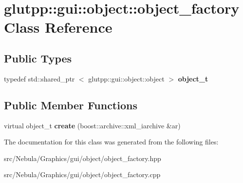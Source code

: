 \hypertarget{classglutpp_1_1gui_1_1object_1_1object__factory}{\section{glutpp\-:\-:gui\-:\-:object\-:\-:object\-\_\-factory \-Class \-Reference}
\label{classglutpp_1_1gui_1_1object_1_1object__factory}
}
\subsection*{\-Public \-Types}
\begin{DoxyCompactItemize}
\item 
\hypertarget{classglutpp_1_1gui_1_1object_1_1object__factory_a4a6e3b986deecc14be3b9f2f15dbd6f2}{typedef std\-::shared\-\_\-ptr\*
$<$ glutpp\-::gui\-::object\-::object $>$ {\bfseries object\-\_\-t}}\label{classglutpp_1_1gui_1_1object_1_1object__factory_a4a6e3b986deecc14be3b9f2f15dbd6f2}

\end{DoxyCompactItemize}
\subsection*{\-Public \-Member \-Functions}
\begin{DoxyCompactItemize}
\item 
\hypertarget{classglutpp_1_1gui_1_1object_1_1object__factory_a68964b5574633f3dc6afd55e26e76958}{virtual object\-\_\-t {\bfseries create} (boost\-::archive\-::xml\-\_\-iarchive \&ar)}\label{classglutpp_1_1gui_1_1object_1_1object__factory_a68964b5574633f3dc6afd55e26e76958}

\end{DoxyCompactItemize}


\-The documentation for this class was generated from the following files\-:\begin{DoxyCompactItemize}
\item 
src/\-Nebula/\-Graphics/gui/object/object\-\_\-factory.\-hpp\item 
src/\-Nebula/\-Graphics/gui/object/object\-\_\-factory.\-cpp\end{DoxyCompactItemize}
